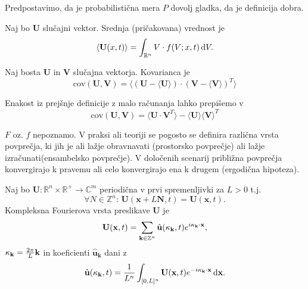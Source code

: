 \documentclass[mat2, tisk]{fmfdelo}
\newcommand{\R}{\mathbb R}
\newcommand{\Z}{\mathbb Z}
\newcommand{\bd}{\textbf}
\newcommand{\C}{\mathbb C}
\begin{document}
\begin{opomba}
Predpostavimo, da je probabilistična mera $P$ dovolj gladka, da je definicija dobra.
\end{opomba}

\begin{definicija}
Naj bo $\bd{U}$ slučajni vektor. Srednja (pričakovana) vrednost je 
\begin{equation}
\langle \bd{U}(x, t) \rangle = \int_{\R^n} V \cdot f(V; x, t) \dif V.
\end{equation}
\end{definicija}

\begin{definicija}
Naj bosta $\bd{U}$ in $\bd{V}$ slučajna vektorja. Kovarianca je 
\begin{equation}
\text{cov}(\bd{U}, \bd{V}) = \langle (\bd{U} - \langle \bd{U} \rangle)\cdot (\bd{V} - \langle \bd{V} \rangle)^T \rangle
\end{equation}
\end{definicija}

\begin{opomba}
Enakost iz prejšnje definicije z malo računanja lahko prepišemo v 
\begin{equation}
\text{cov}(\bd{U}, \bd{V}) = \langle \bd{U}\cdot \bd{V}^T \rangle - \langle \bd{U} \rangle  \langle \bd{V} \rangle^T
\end{equation}
\end{opomba}

\noindent
$F$ oz. $f$ nepoznamo. V praksi ali teoriji se pogosto se definira različna vrsta povprečja, 
ki jih je ali lažje obravnavati (prostorsko povprečje) ali lažje izračunati(ensambelsko povprečje).
V določenih scenarij približna povprečja konvergirajo k pravemu 
ali celo konvergirajo ena k drugem (ergodična hipoteza). 

\begin{definicija}
Naj bo $\bd{U}: \R^n \times \R^+ \rightarrow \C^m$ periodična v prvi spremenljivki za $L>0$ t.j. 
$$
\forall N\in \Z^n: \,\bd{U}(\bd{x} + L\bd{N}, t) = \bd{U}(\bd{x}, t).
$$
Kompleksna Fourierova vrsta preslikave $\bd{U}$ je 
\begin{equation}
\bd{U}(\bd{x}, t) = \sum_{\bd{k}\in \Z^{n}} \hat{\bd{u}}(\bd{\text{$\kappa$}}_\bd{k}, t) e^{i\bd{\text{$\kappa$}}_\bd{k} \cdot \bd{x}},
\end{equation}
$\bd{\text{$\kappa$}}_\bd{k} = \frac{2\pi}{L} \bd{k}$ in koeficienti $\hat{\bd{u}}_\bd{k}$ dani z 
\begin{equation}
\hat{\bd{u}}(\bd{\text{$\kappa$}}_\bd{k}, t) = \frac{1}{L^n} \int_{[0, L]^n} \bd{U}(\bd{x}, t) e^{-i\bd{\text{$\kappa$}}_\bd{k} \cdot \bd{x}} \dif \bd{x}.
\end{equation}
\end{definicija}
\end{document}
